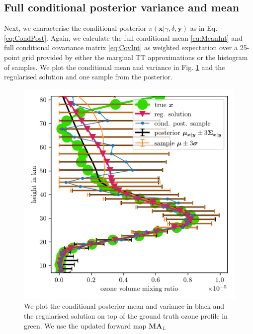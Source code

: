 \subsection{Full conditional posterior variance and mean}
Next, we characterise the conditional posterior $\pi(\bm{x}|\gamma, \delta, \bm{y})$ as in Eq. \ref{eq:CondPost}. 
Again, we calculate the full conditional mean \ref{eq:MeanInt} and full conditional covariance matrix \ref{eq:CovInt} as weighted expectation over a 25-point grid provided by either the marginal TT approximations or the histogram of samples.
We plot the conditional mean and variance in Fig. \ref{fig:O3SolplsReg} and the regularised solution and one sample from the posterior.
\begin{figure}[ht!]
	\centering
	\includegraphics{SecRecResinclRegandSampl.png}
	\caption[Ozone posterior mean and variance and the regularised solution compared to the ground truth.]{We plot the conditional posterior mean and variance in black and the regularised solution on top of the ground truth ozone profile in green. We use the updated forward map $\bm{M}\bm{A}_L$}
	\label{fig:O3SolplsReg}
\end{figure}

